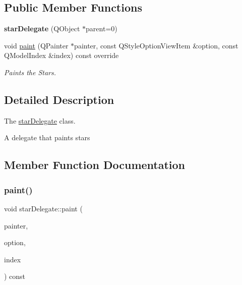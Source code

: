 \subsection*{Public Member Functions}
\begin{DoxyCompactItemize}
\item 
\mbox{\label{classstar_delegate_abf63fe9c7fe7e4c2253168e69eca595c}} 
{\bfseries star\+Delegate} (Q\+Object $\ast$parent=0)
\item 
void \mbox{\hyperlink{classstar_delegate_a563a1503f4f1bd5e5f2d8762b95167c7}{paint}} (Q\+Painter $\ast$painter, const Q\+Style\+Option\+View\+Item \&option, const Q\+Model\+Index \&index) const override
\begin{DoxyCompactList}\small\item\em Paints the Stars. \end{DoxyCompactList}\end{DoxyCompactItemize}


\subsection{Detailed Description}
The \mbox{\hyperlink{classstar_delegate}{star\+Delegate}} class. 

A delegate that paints stars 

\subsection{Member Function Documentation}
\mbox{\label{classstar_delegate_a563a1503f4f1bd5e5f2d8762b95167c7}} 
\subsubsection{\texorpdfstring{paint()}{paint()}}
{\footnotesize\ttfamily void star\+Delegate\+::paint (\begin{DoxyParamCaption}\item[{Q\+Painter $\ast$}]{painter,  }\item[{const Q\+Style\+Option\+View\+Item \&}]{option,  }\item[{const Q\+Model\+Index \&}]{index }\end{DoxyParamCaption}) const\hspace{0.3cm}{\ttfamily [override]}}



